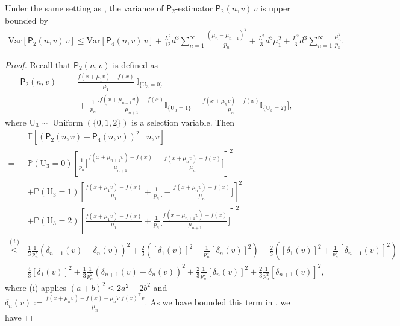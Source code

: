 \documentclass[10pt,a4paper]{amsart}
\newcommand{\EE}{\mathbb{E}}
\newcommand{\PP}{\mathbb{P}}
\newcommand{\Var}{\mathrm{Var}}
\newcommand{\sfP}{\mathsf{P}}
\begin{document}
\begin{lemma}\label{lemma:variance-p2}
    Under the same setting as , the variance of $\sfP_2$-estimator $\mathsf P_2(n,v)\,v$ is upper bounded by
\begin{align*}
    \Var[\sfP_2(n,v) \, v ]  
    \leq  \Var[\sfP_4(n,v)\, v] + \frac{L^2}{12}  d^3\sum_{n=1}^\infty \frac{(\mu_n - \mu_{n+1})^2}{p_n} + \frac{L^2 }{3} d^3\mu_1^2 + \frac{L^2}{3} d^3 \sum_{n=1}^\infty \frac{\mu_n^2}{p_n}.
\end{align*}
\end{lemma}

\begin{proof}
Recall that $\mathsf{P}_2(n,v)$ is defined as 
\begin{align*}
    \mathsf{P}_2(n, v)
= 
&\;\frac{f(x+\mu_1 v)-f(x)}{\mu_1}\,\mathbb{I}_{\{\mathrm{U}_3=0\}}  \\ 
&\;+\;\frac{1}{p_n}\Biggl[
    \frac{f(x+\mu_{n+1} v)-f(x)}{\mu_{n+1}}\mathbb{I}_{\{\mathrm{U}_3=1\}}
  - \frac{f(x+\mu_n v)-f(x)}{\mu_n}\mathbb{I}_{\{\mathrm{U}_3=2\}}
\Biggr],
\end{align*} 
where $\mathrm{U}_3\sim  \operatorname{Uniform}\left( \{ 0, 1,2 \}\right)$ is a selection variable. Then 
\begin{align*}
    &\EE[ (\mathsf{P}_2(n, v) - \mathsf{P}_4(n, v))^2\mid n,v] \\
    = &\PP(\mathrm{U}_3=0) \left[  \frac{1}{p_n}\Biggl[ \frac{f(x+\mu_{n+1} v)-f(x)}{\mu_{n+1}} - \frac{f(x+\mu_n v)-f(x)}{\mu_n} \Biggr] \right]^2  \\ 
    &+\PP(\mathrm{U}_3=1) \left[\frac{f(x+\mu_1 v)-f(x)}{\mu_1}  +    \frac{1}{p_n}\Biggl[  - \frac{f(x+\mu_n v)-f(x)}{\mu_n} \Biggr] \right]^2  \\ 
      &+\PP(\mathrm{U}_3=2) \left[\frac{f(x+\mu_1 v)-f(x)}{\mu_1}  +   \frac{1}{p_n}\Biggl[ \frac{f(x+\mu_{n+1} v)-f(x)}{\mu_{n+1}} \Biggr]  \right]^2  \\  
    \overset{(i)}{\leq} & \frac{1}{3} \frac{1}{p_n^2} \left( \delta_{n+1}(v) - \delta_n(v)\right)^2 + \frac{2}{3} \left( [\delta_1(v)]^2 + \frac{1}{p_n^2} [\delta_n(v)]^2 \right)+ \frac{2}{3} \left( [\delta_1(v)]^2 + \frac{1}{p_n^2} [\delta_{n+1}(v)]^2 \right)\\
   = &  \frac{4}{3}[\delta_1(v)]^2  + \frac{1}{3} \frac{1}{p_n^2} \left( \delta_{n+1}(v) - \delta_n(v)\right)^2 + \frac{2}{3} \frac{1}{p_n^2} [\delta_{n}(v)]^2 +  \frac{2}{3} \frac{1}{p_n^2} [\delta_{n+1}(v)]^2 ,
    \end{align*}
    where (i) applies $(a+b)^2 \leq 2a^2 + 2b^2$ and $\delta_n(v):= \frac{f(x+\mu_n v) - f(x) -\mu_n \nabla f(x)^\top v}{\mu_n}$. As we have bounded this term in , we have

\end{proof}
\end{document}
